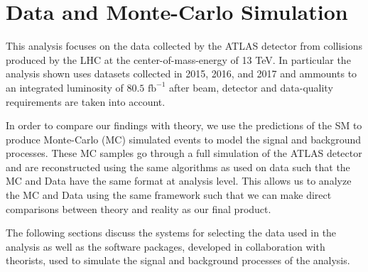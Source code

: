 \chapter{Data and Monte-Carlo Simulation} \label{chap:data}

This analysis focuses on the data collected by the ATLAS detector from \pp
collisions produced by the LHC at the center-of-mass-energy of 13 TeV.  In
particular the analysis shown uses datasets collected in 2015, 2016, and 2017
and ammounts to an integrated luminosity of $80.5 \text{ fb}^{-1}$ after beam,
detector and data-quality requirements are taken into account. 

In order to compare our findings with theory, we use the predictions of the SM
to produce Monte-Carlo (MC) simulated events to model the signal and background
processes.  These MC samples go through a full simulation of the ATLAS detector
and are reconstructed using the same algorithms as used on data such that the
MC and Data have the same format at analysis level. This allows us to analyze
the MC and Data using the same framework such that we can make direct
comparisons between theory and reality as our final product.

The following sections discuss the systems for selecting the data used in the
analysis as well as the software packages, developed in collaboration with
theorists, used to simulate the signal and background processes of the
analysis.




